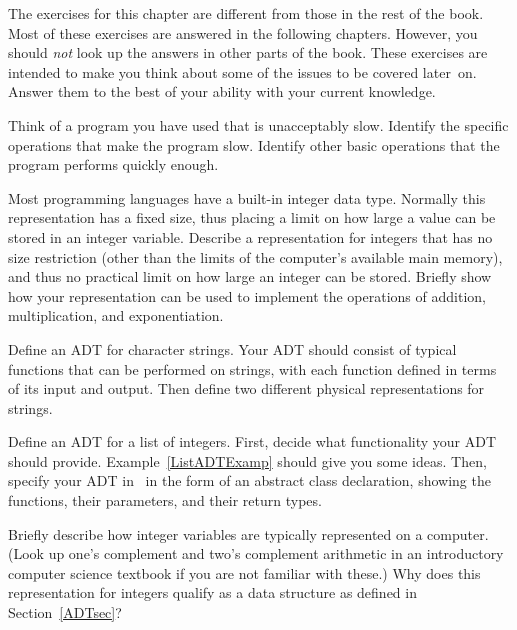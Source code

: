 The exercises for this chapter are different from those in the rest
of the book.
Most of these exercises are answered in the following chapters.
However, you should \emph{not} look up the answers in other parts of
the book.
These exercises are intended to make you think about some of the
issues to be covered later~on.
Answer them to the best of your ability with your current knowledge.

\begin{exercises}

\item
Think of a program you have used that is unacceptably slow.
Identify the specific operations that make the program slow.
Identify other basic operations that the
program performs quickly enough.

\item
Most programming languages have a built-in integer data type.
Normally this representation has a fixed size, thus placing
a limit on how large a value can be stored in an integer variable.
Describe a representation for integers that has no size restriction
(other than the limits of the computer's available main memory), and
thus no practical limit on how large an integer can be stored.
Briefly show how your representation can be used to implement the
operations of addition, multiplication, and exponentiation.

\item
Define an ADT for character strings.
Your ADT should consist of typical functions that can be performed on
strings, with each function defined in terms of its input and output.
Then define two different physical representations for strings.

\item
Define an ADT for a list of integers.
First, decide what functionality your ADT should provide.
Example~\ref{ListADTExamp} should give you some ideas.
Then, specify your ADT in \Lang\ in the form of an abstract class
declaration, showing the functions, their parameters, and their return
types.

\item
Briefly describe how integer variables are typically represented on a
computer.
(Look up one's complement and two's complement arithmetic in an
introductory computer science textbook if you are not familiar with
these.)
Why does this representation for integers qualify as a data structure
as defined in Section~\ref{ADTsec}?


\end{exercises}
